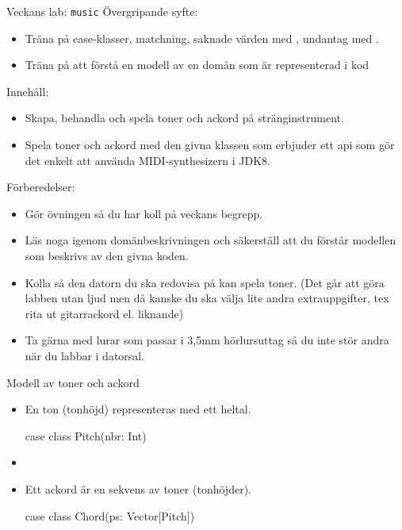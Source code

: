 
\begin{Slide}{Veckans lab: \texttt{music}}\SlideFontSmall
Övergripande syfte:
\begin{itemize}
\item Träna på case-klasser, matchning, saknade värden med , undantag med .
\item Träna på att förstå en modell av en domän som är representerad i kod
\end{itemize}

Innehåll:
\begin{itemize}
\item Skapa, behandla och spela toner och ackord på stränginstrument.
\item Spela toner och ackord med den givna klassen  som erbjuder ett api som gör det enkelt att använda MIDI-synthesizern i JDK8.
\end{itemize}

Förberedelser:
\begin{itemize}
  \item Gör övningen så du har koll på veckans begrepp.
  \item Läs noga igenom domänbeskrivningen och säkerställ att du förstår modellen som beskrivs av den givna koden.
  \item Kolla så den datorn du ska redovisa på kan spela toner. (Det går att göra labben utan ljud men då kanske du ska välja lite andra extrauppgifter, tex rita ut gitarrackord el. liknande)
  \item Ta gärna med lurar som passar i 3,5mm hörlursuttag så du inte stör andra när du labbar i datorsal.
\end{itemize}

\end{Slide}


\begin{Slide}{Modell av toner och ackord}

\begin{itemize}
\item En ton (tonhöjd) representeras med ett heltal.
\begin{Code}
case class Pitch(nbr: Int)
\end{Code}

\item[]

\item Ett ackord är en sekvens av toner (tonhöjder).
\begin{Code}
case class Chord(ps: Vector[Pitch])
\end{Code}
\end{itemize}

\end{Slide}


